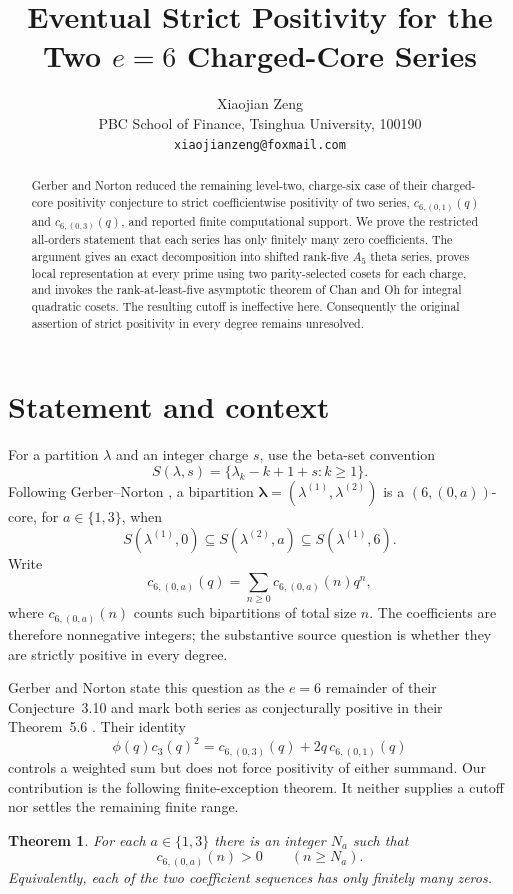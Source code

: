 \documentclass[11pt]{article}
\title{Eventual Strict Positivity for the Two \texorpdfstring{$e=6$}{e=6}
Charged-Core Series}
\author{Xiaojian Zeng\\
\small PBC School of Finance, Tsinghua University, 100190\\
\small \texttt{xiaojianzeng@foxmail.com}}
\date{}
\newtheorem{theorem}{Theorem}
\theoremstyle{remark}
\begin{document}
\maketitle

\begin{abstract}
Gerber and Norton reduced the remaining level-two, charge-six case of their
charged-core positivity conjecture to strict coefficientwise positivity of
two series, $c_{6,(0,1)}(q)$ and $c_{6,(0,3)}(q)$, and reported finite
computational support.  We prove the restricted all-orders statement that
each series has only finitely many zero coefficients.  The argument gives an
exact decomposition into shifted rank-five $A_5$ theta series, proves local
representation at every prime using two parity-selected cosets for each
charge, and invokes the rank-at-least-five asymptotic theorem of Chan and Oh
for integral quadratic cosets.  The resulting cutoff is ineffective here.
Consequently the original assertion of strict positivity in every degree
remains unresolved.
\end{abstract}

\section{Statement and context}

For a partition $\lambda$ and an integer charge $s$, use the beta-set
convention
\[
 S(\lambda,s)=\{\lambda_k-k+1+s:k\geq 1\}.
\]
Following Gerber--Norton \cite{GerberNorton2026}, a bipartition
$\boldsymbol\lambda=(\lambda^{(1)},\lambda^{(2)})$ is a
$(6,(0,a))$-core, for $a\in\{1,3\}$, when
\[
 S(\lambda^{(1)},0)\subseteq S(\lambda^{(2)},a)
 \subseteq S(\lambda^{(1)},6).
\]
Write
\[
 c_{6,(0,a)}(q)=\sum_{n\geq 0}c_{6,(0,a)}(n)q^n,
\]
where $c_{6,(0,a)}(n)$ counts such bipartitions of total size $n$.
The coefficients are therefore nonnegative integers; the substantive source
question is whether they are strictly positive in every degree.

Gerber and Norton state this question as the $e=6$ remainder of their
Conjecture~3.10 and mark both series as conjecturally positive in their
Theorem~5.6 \cite{GerberNorton2026}.  Their identity
\[
 \phi(q)c_3(q)^2=c_{6,(0,3)}(q)+2q\,c_{6,(0,1)}(q)
\]
controls a weighted sum but does not force positivity of either summand.
Our contribution is the following finite-exception theorem.  It neither
supplies a cutoff nor settles the remaining finite range.

\begin{theorem}\label{thm:main}
For each $a\in\{1,3\}$ there is an integer $N_a$ such that
\[
 c_{6,(0,a)}(n)>0\qquad(n\geq N_a).
\]
Equivalently, each of the two coefficient sequences has only finitely many
zeros.
\end{theorem}
\end{document}
